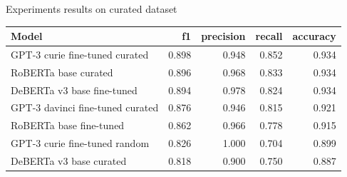 \documentclass[aspectratio=149]{beamer}
\begin{document}
\begin{frame}{Experiments results on curated dataset}
\fontsize{9pt}{10pt}\selectfont
\begin{table}[!htb]
    \centering
    \label{tab:results2}
\begin{tabular}{lrrrr}
\toprule
                        Model &    f1 &  precision &  recall &  accuracy \\
\midrule
  GPT-3 curie fine-tuned curated & 0.898 &      0.948 &   0.852 &     0.934 \\
            RoBERTa base curated & 0.896 &      0.968 &   0.833 &     0.934 \\
      DeBERTa v3 base fine-tuned & 0.894 &      0.978 &   0.824 &     0.934 \\
GPT-3 davinci fine-tuned curated & 0.876 &      0.946 &   0.815 &     0.921 \\
         RoBERTa base fine-tuned & 0.862 &      0.966 &   0.778 &     0.915 \\
   GPT-3 curie fine-tuned random & 0.826 &      1.000 &   0.704 &     0.899 \\
         DeBERTa v3 base curated & 0.818 &      0.900 &   0.750 &     0.887 \\
\bottomrule
\end{tabular}
\end{table}

\end{frame}
\end{document}
